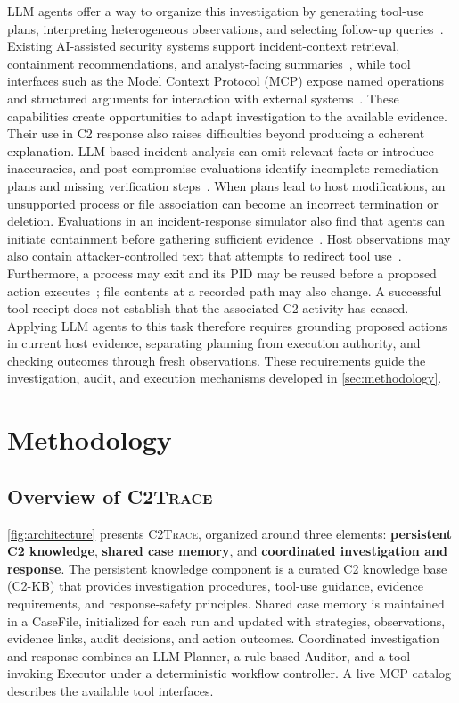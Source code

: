 \documentclass[pdflatex,sn-basic]{sn-jnl}
\newcommand{\system}{\textsc{C2Trace}\xspace}
\begin{document}
LLM agents offer a way to organize this investigation by generating tool-use plans, interpreting heterogeneous observations, and selecting follow-up queries~\citep{sirbench2026,secrespond2026}. Existing AI-assisted security systems support incident-context retrieval, containment recommendations, and analyst-facing summaries~\citep{guided-response2025,kramer2025}, while tool interfaces such as the Model Context Protocol (MCP) expose named operations and structured arguments for interaction with external systems~\citep{mcp-tools}. These capabilities create opportunities to adapt investigation to the available evidence. Their use in C2 response also raises difficulties beyond producing a coherent explanation. LLM-based incident analysis can omit relevant facts or introduce inaccuracies, and post-compromise evaluations identify incomplete remediation plans and missing verification steps~\citep{kramer2025,secrespond2026}. When plans lead to host modifications, an unsupported process or file association can become an incorrect termination or deletion. Evaluations in an incident-response simulator also find that agents can initiate containment before gathering sufficient evidence~\citep{opensec2026}. Host observations may also contain attacker-controlled text that attempts to redirect tool use~\citep{greshake2023,agentdojo2024,injecagent2024}. Furthermore, a process may exit and its PID may be reused before a proposed action executes~\citep{windows-process}; file contents at a recorded path may also change. A successful tool receipt does not establish that the associated C2 activity has ceased. Applying LLM agents to this task therefore requires grounding proposed actions in current host evidence, separating planning from execution authority, and checking outcomes through fresh observations. These requirements guide the investigation, audit, and execution mechanisms developed in \autoref{sec:methodology}.

\section{Methodology}
\label{sec:methodology}

\subsection{Overview of \system}
\label{sec:system-overview}

\autoref{fig:architecture} presents \system, organized around three elements: \textbf{persistent C2 knowledge}, \textbf{shared case memory}, and \textbf{coordinated investigation and response}. The persistent knowledge component is a curated C2 knowledge base (C2-KB) that provides investigation procedures, tool-use guidance, evidence requirements, and response-safety principles. Shared case memory is maintained in a CaseFile, initialized for each run and updated with strategies, observations, evidence links, audit decisions, and action outcomes. Coordinated investigation and response combines an LLM Planner, a rule-based Auditor, and a tool-invoking Executor under a deterministic workflow controller. A live MCP catalog describes the available tool interfaces.
\end{document}
